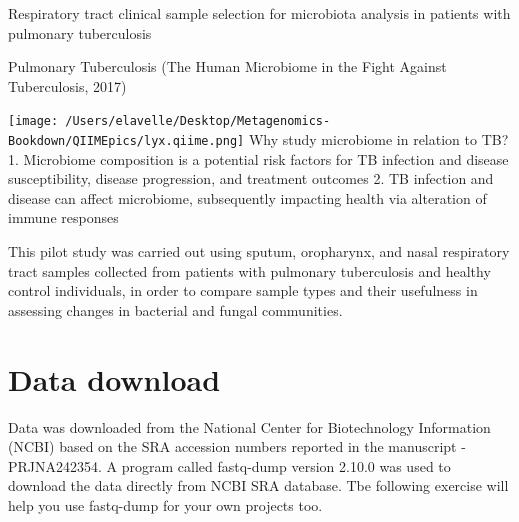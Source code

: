 \documentclass[
]{book}
\begin{document}
Respiratory tract clinical sample selection for microbiota analysis in patients with pulmonary tuberculosis

Pulmonary Tuberculosis (The Human Microbiome in the Fight Against Tuberculosis, 2017)

\texttt{[image: /Users/elavelle/Desktop/Metagenomics-Bookdown/QIIMEpics/lyx.qiime.png]}
Why study microbiome in relation to TB?
1. Microbiome composition is a potential risk factors for TB infection and disease susceptibility, disease progression,
and treatment outcomes
2. TB infection and disease can affect microbiome, subsequently impacting health via alteration of immune responses

This pilot study was carried out using sputum, oropharynx, and nasal respiratory tract samples collected from patients
with pulmonary tuberculosis and healthy control individuals, in order to compare sample types and their usefulness in
assessing changes in bacterial and fungal communities.

\hypertarget{data-download}{%
\section{Data download}\label{data-download}}

Data was downloaded from the National Center for Biotechnology Information (NCBI) based on the SRA accession
numbers reported in the manuscript - PRJNA242354.
A program called fastq-dump version 2.10.0 was used to download the data directly from NCBI SRA database. Tbe
following exercise will help you use fastq-dump for your own projects too.
\end{document}
